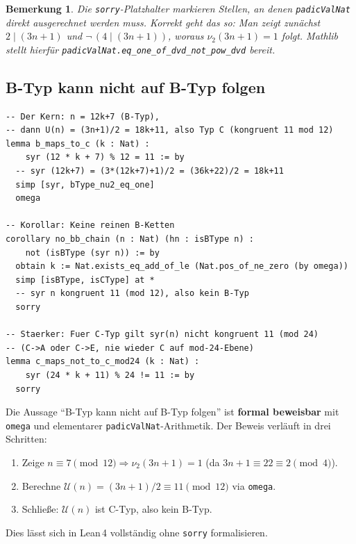 \documentclass[12pt,a4paper]{article}
\newtheorem{bemerkung}[definition]{Bemerkung}
\newcommand{\vii}{\nu_2}
\newcommand{\U}{\mathcal{U}}
\begin{document}
\begin{bemerkung}
Die \lstinline|sorry|-Platzhalter markieren Stellen, an denen
\lstinline|padicValNat| direkt ausgerechnet werden muss.
Korrekt geht das so: Man zeigt zunächst
$2 \mid (3n+1)$ und $\neg\,(4 \mid (3n+1))$, woraus $\vii(3n+1) = 1$ folgt.
Mathlib stellt hierfür \lstinline|padicValNat.eq_one_of_dvd_not_pow_dvd| bereit.
\end{bemerkung}

\subsection{B-Typ kann nicht auf B-Typ folgen}

\begin{tcolorbox}[lean, title={Lean\,4-Code: B→C, kein B→B}]
\begin{lstlisting}
-- Der Kern: n = 12k+7 (B-Typ),
-- dann U(n) = (3n+1)/2 = 18k+11, also Typ C (kongruent 11 mod 12)
lemma b_maps_to_c (k : Nat) :
    syr (12 * k + 7) % 12 = 11 := by
  -- syr (12k+7) = (3*(12k+7)+1)/2 = (36k+22)/2 = 18k+11
  simp [syr, bType_nu2_eq_one]
  omega

-- Korollar: Keine reinen B-Ketten
corollary no_bb_chain (n : Nat) (hn : isBType n) :
    not (isBType (syr n)) := by
  obtain k := Nat.exists_eq_add_of_le (Nat.pos_of_ne_zero (by omega))
  simp [isBType, isCType] at *
  -- syr n kongruent 11 (mod 12), also kein B-Typ
  sorry

-- Staerker: Fuer C-Typ gilt syr(n) nicht kongruent 11 (mod 24)
-- (C->A oder C->E, nie wieder C auf mod-24-Ebene)
lemma c_maps_not_to_c_mod24 (k : Nat) :
    syr (24 * k + 11) % 24 != 11 := by
  sorry
\end{lstlisting}
\end{tcolorbox}

\begin{tcolorbox}[ergebnis]
Die Aussage ``B-Typ kann nicht auf B-Typ folgen'' ist
\textbf{formal beweisbar} mit \lstinline|omega| und
elementarer \lstinline|padicValNat|-Arithmetik.
Der Beweis verläuft in drei Schritten:
\begin{enumerate}
  \item Zeige $n \equiv 7 \pmod{12} \Rightarrow \vii(3n+1) = 1$
    (da $3n+1 \equiv 22 \equiv 2 \pmod{4}$).
  \item Berechne $\U(n) = (3n+1)/2 \equiv 11 \pmod{12}$ via \lstinline|omega|.
  \item Schließe: $\U(n)$ ist C-Typ, also kein B-Typ.
\end{enumerate}
Dies lässt sich in Lean\,4 vollständig ohne \lstinline|sorry| formalisieren.
\end{tcolorbox}
\end{document}
